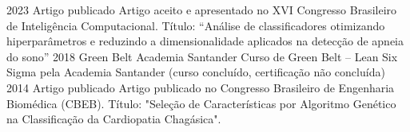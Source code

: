 \documentclass[9pt]{developercv} %
\begin{document}
	\begin{entrylist}
		\entry
		{2023}
		{Artigo publicado}
		{}
		{%
			Artigo aceito e apresentado no XVI Congresso Brasileiro de Inteligência Computacional. Título: “Análise de classificadores otimizando hiperparâmetros e reduzindo a dimensionalidade aplicados na detecção de apneia do sono”}
		\entry
		{2018}
		{Green Belt}
		{Academia Santander}
		{%
			Curso de Green Belt – Lean Six Sigma pela Academia Santander (curso concluído, certificação não concluída)}
		\entry
		{2014}
		{Artigo publicado}
		{}
		{%
			Artigo publicado no Congresso Brasileiro de Engenharia Biomédica (CBEB). Título: "Seleção de Características por Algoritmo Genético na Classificação da Cardiopatia Chagásica".}
	\end{entrylist}
	
	
	
\end{document}
